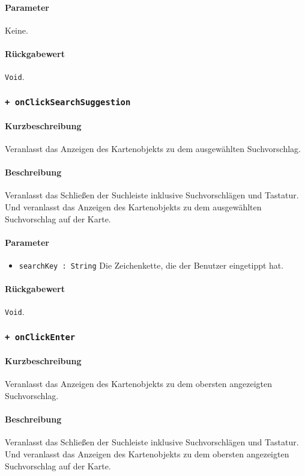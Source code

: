 \paragraph*{Parameter}
Keine.
\paragraph*{Rückgabewert}
\texttt{Void}.

\subsubsection*{\texttt{+ onClickSearchSuggestion}}%
\paragraph*{Kurzbeschreibung}
Veranlasst das Anzeigen des Kartenobjekts zu dem ausgewählten Suchvorschlag.
\paragraph*{Beschreibung}
Veranlasst das Schließen der Suchleiste inklusive Suchvorschlägen und Tastatur.
Und veranlasst das Anzeigen des Kartenobjekts zu dem ausgewählten Suchvorschlag auf der Karte.
\paragraph*{Parameter}
\begin{itemize}
    \item \texttt{searchKey : String} Die Zeichenkette, die der Benutzer eingetippt hat.
\end{itemize}
\paragraph*{Rückgabewert}
\texttt{Void}.

\subsubsection*{\texttt{+ onClickEnter}}%
\paragraph*{Kurzbeschreibung}
Veranlasst das Anzeigen des Kartenobjekts zu dem obersten angezeigten Suchvorschlag.
\paragraph*{Beschreibung}
Veranlasst das Schließen der Suchleiste inklusive Suchvorschlägen und Tastatur.
Und veranlasst das Anzeigen des Kartenobjekts zu dem obersten angezeigten Suchvorschlag auf der Karte.

